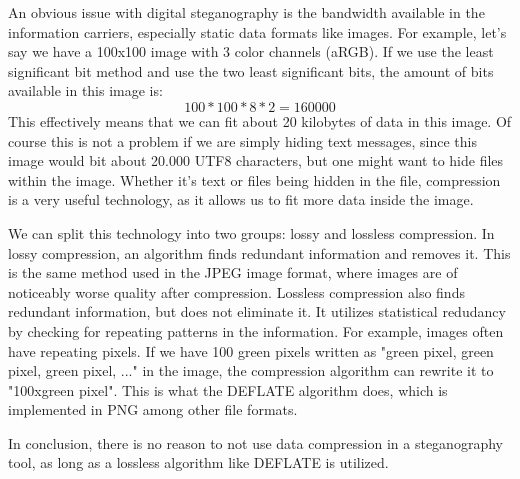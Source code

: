 An obvious issue with digital steganography is the bandwidth available in the information carriers, especially static data formats like images. For example, let's say we have a 100x100 image with 3 color channels (aRGB). If we use the least significant bit method and use the two least significant bits, the amount of bits available in this image is:
\begin{equation}100*100*8*2=160000\end{equation}
This effectively means that we can fit about 20 kilobytes of data in this image. Of course this is not a problem if we are simply hiding text messages, since this image would bit about 20.000 UTF8 characters, but one might want to hide files within the image. Whether it's text or files being hidden in the file, compression is a very useful technology, as it allows us to fit more data inside the image.

We can split this technology into two groups: lossy and lossless compression. In lossy compression, an algorithm finds redundant information and removes it. This is the same method used in the JPEG image format, where images are of noticeably worse quality after compression. Lossless compression also finds redundant information, but does not eliminate it. It utilizes statistical redudancy by checking for repeating patterns in the information. For example, images often have repeating pixels. If we have 100 green pixels written as "green pixel, green pixel, green pixel, ..." in the image, the compression algorithm can rewrite it to "100xgreen pixel". This is what the DEFLATE algorithm does, which is implemented in PNG among other file formats. 

In conclusion, there is no reason to not use data compression in a steganography tool, as long as a lossless algorithm like DEFLATE is utilized. 